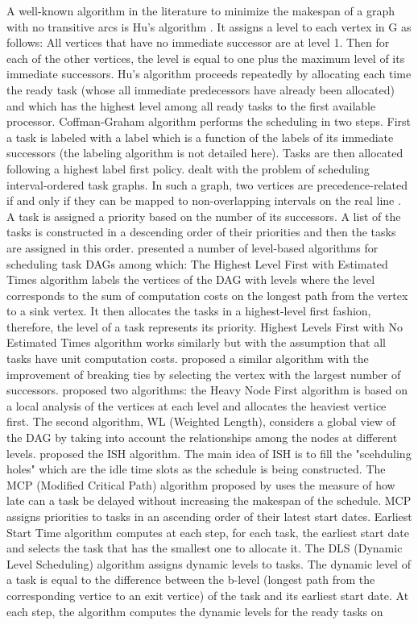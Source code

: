 A well-known algorithm in the literature to minimize the makespan of a graph with no transitive arcs is Hu's algorithm \cite{hu:1961}. It assigns a level to each vertex in G as follows: All vertices that have no immediate successor are at level 1. Then for each of the other vertices, the level is equal to one plus the maximum level of its immediate successors. Hu's algorithm proceeds repeatedly by allocating each time the ready task (whose all immediate predecessors have already been allocated) and which has the highest level among all ready tasks to the first available processor. Coffman-Graham algorithm \cite{coffman:1972} performs the scheduling in two steps. First a task is labeled with a label which is a function of the labels of its immediate successors (the labeling algorithm is not detailed here). Tasks are then allocated following a highest label first policy. \cite{papadimitriou:1979} dealt with the problem of scheduling interval-ordered task graphs. In such a graph, two vertices are precedence-related if and only if they can be mapped to non-overlapping intervals on the real line \cite{fishburn:1985}. A task is assigned a priority based on the number of its successors. A list of the tasks is constructed in a descending order of their priorities and then the tasks are assigned in this order. \cite{adam:1974} presented a number of level-based algorithms for scheduling task DAGs among which: The Highest Level First with Estimated Times algorithm labels the vertices of the DAG with levels where the level corresponds to the sum of computation costs on the longest path from the vertex to a sink vertex. It then allocates the tasks in a highest-level first fashion, therefore, the level of a task represents its priority. Highest Levels First with No Estimated Times algorithm works similarly but with the assumption that all tasks have unit computation costs. \cite{kasahara:1984} proposed a similar algorithm with the improvement of breaking ties by selecting the vertex with the largest number of successors. \cite{shirazi:1990} proposed two algorithms: the Heavy Node First algorithm is based on a local analysis of the vertices at each level and allocates the heaviest vertice first. The second algorithm, WL (Weighted Length), considers a global view of the DAG by taking into account the relationships among the nodes at different levels. \cite{kruatrachue:1987} proposed the ISH algorithm. The main idea of ISH is to fill the "scehduling holes"  which are the idle time slots as the schedule is being constructed. The MCP (Modified Critical Path) algorithm proposed by \cite{wu:1990} uses the measure of how late can a task be delayed without increasing the makespan of the schedule. MCP assigns priorities to tasks in an ascending order of their latest start dates. \cite{hwang:1989} Earliest Start Time algorithm computes at each step, for each task, the earliest start date and selects the task that has the smallest one to allocate it. The DLS (Dynamic Level Scheduling) algorithm \cite{sih:1993} assigns dynamic levels to tasks. The dynamic level of a task is equal to the difference between the b-level (longest path from the corresponding vertice to an exit vertice) of the task and its earliest start date. At each step, the algorithm computes the dynamic levels for the ready tasks on 